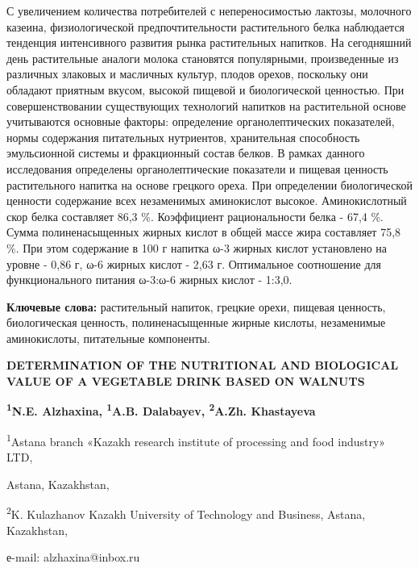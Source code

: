 С увеличением количества потребителей с непереносимостью лактозы,
молочного казеина, физиологической предпочтительности растительного
белка наблюдается тенденция интенсивного развития рынка растительных
напитков. На сегодняшний день растительные аналоги молока становятся
популярными, произведенные из различных злаковых и масличных культур,
плодов орехов, поскольку они обладают приятным вкусом, высокой пищевой и
биологической ценностью. При совершенствовании существующих технологий
напитков на растительной основе учитываются основные факторы:
определение органолептических показателей, нормы содержания питательных
нутриентов, хранительная способность эмульсионной системы и фракционный
состав белков. В рамках данного исследования определены
органолептические показатели и пищевая ценность растительного напитка на
основе грецкого ореха. При определении биологической ценности содержание
всех незаменимых аминокислот высокое. Аминокислотный скор белка
составляет 86,3 \%. Коэффициент рациональности белка - 67,4 \%. Сумма
полиненасыщенных жирных кислот в общей массе жира составляет 75,8 \%.
При этом содержание в 100 г напитка ω-3 жирных кислот установлено на
уровне - 0,86 г, ω-6 жирных кислот - 2,63 г. Оптимальное соотношение для
функционального питания ω-3:ω-6 жирных кислот - 1:3,0.

{\bfseries Ключевые слова:} растительный напиток, грецкие орехи, пищевая
ценность, биологическая ценность, полиненасыщенные жирные кислоты,
незаменимые аминокислоты, питательные компоненты.

\begin{center}
{\large\bfseries DETERMINATION OF THE NUTRITIONAL AND BIOLOGICAL VALUE OF A VEGETABLE DRINK BASED ON WALNUTS}

{\bfseries \textsuperscript{1}N.E. Alzhaxina, \textsuperscript{1}A.B.
Dalabayev, \textsuperscript{2}A.Zh. Khastayeva}

\textsuperscript{1}Astana branch «Kazakh research institute of
processing and food industry» LTD,

Astana, Kazakhstan,

\textsuperscript{2}K. Kulazhanov Kazakh University of Technology and
Business, Astana, Kazakhstan,

е-mail: alzhaxina@inbox.ru
\end{center}

